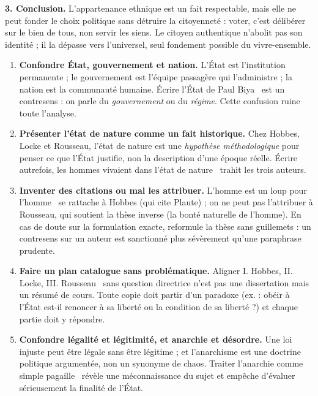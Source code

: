 \documentclass[11pt]{article}
\newcommand{\cle}[1]{{\popxbold\color{popdark}#1}}
\begin{document}
\begin{exoresolu}
\textbf{3. Conclusion.} L'appartenance ethnique est un fait respectable, mais elle ne peut fonder le choix politique sans détruire la citoyenneté : voter, c'est délibérer sur le bien de tous, non servir les siens. Le citoyen authentique n'abolit pas son identité ; il la dépasse vers l'universel, seul fondement possible du vivre-ensemble.
\end{exoresolu}

\begin{attention}
\begin{enumerate}
\item \textbf{Confondre \cle{État}, \cle{gouvernement} et \cle{nation}.} L'État est l'institution permanente ; le gouvernement est l'équipe passagère qui l'administre ; la nation est la communauté humaine. Écrire \guillemotleft l'État de Paul Biya \guillemotright\ est un contresens : on parle du \emph{gouvernement} ou du \emph{régime}. Cette confusion ruine toute l'analyse.
\item \textbf{Présenter l'\cle{état de nature} comme un fait historique.} Chez Hobbes, Locke et Rousseau, l'état de nature est une \emph{hypothèse méthodologique} pour penser ce que l'État justifie, non la description d'une époque réelle. Écrire \guillemotleft autrefois, les hommes vivaient dans l'état de nature \guillemotright\ trahit les trois auteurs.
\item \textbf{Inventer des citations ou mal les attribuer.} \guillemotleft L'homme est un loup pour l'homme \guillemotright\ se rattache à Hobbes (qui cite Plaute) ; on ne peut pas l'attribuer à Rousseau, qui soutient la thèse inverse (la bonté naturelle de l'homme). En cas de doute sur la formulation exacte, reformule la thèse sans guillemets : un contresens sur un auteur est sanctionné plus sévèrement qu'une paraphrase prudente.
\item \textbf{Faire un plan catalogue sans problématique.} Aligner \guillemotleft I. Hobbes, II. Locke, III. Rousseau \guillemotright\ sans question directrice n'est pas une dissertation mais un résumé de cours. Toute copie doit partir d'un paradoxe (ex. : obéir à l'État est-il renoncer à sa liberté ou la condition de sa liberté ?) et chaque partie doit y répondre.
\item \textbf{Confondre \cle{légalité} et \cle{légitimité}, et \cle{anarchie} et désordre.} Une loi injuste peut être légale sans être légitime ; et l'anarchisme est une doctrine politique argumentée, non un synonyme de chaos. Traiter l'anarchie comme simple \guillemotleft pagaille \guillemotright\ révèle une méconnaissance du sujet et empêche d'évaluer sérieusement la finalité de l'État.
\end{enumerate}
\end{attention}
\end{document}
